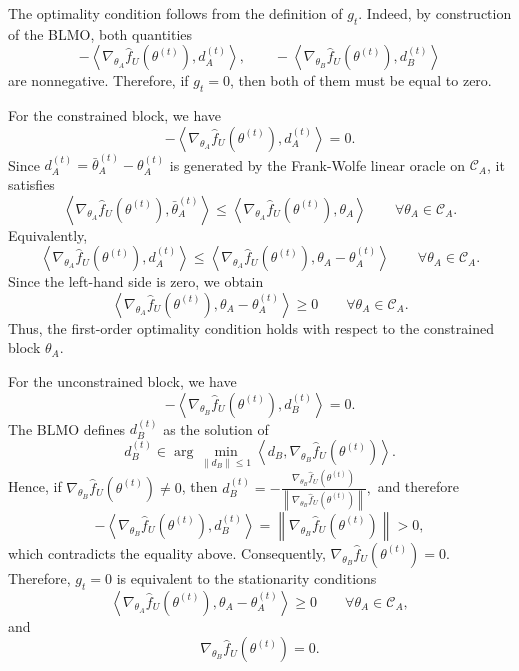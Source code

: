 \documentclass{article}
\begin{document}
The optimality condition follows from the definition of \(g_t\). Indeed, by construction of the
BLMO, both quantities
\[
    -
    \left\langle
        \nabla_{\theta_A}\widehat f_U(\theta^{(t)}),
        d_A^{(t)}
    \right\rangle,
    \qquad
    -
    \left\langle
        \nabla_{\theta_B}\widehat f_U(\theta^{(t)}),
        d_B^{(t)}
    \right\rangle
\]
are nonnegative. Therefore, if \(g_t=0\), then both of them must be equal to zero.

For the constrained block, we have
\[
    -
    \left\langle
        \nabla_{\theta_A}\widehat f_U(\theta^{(t)}),
        d_A^{(t)}
    \right\rangle
    =
    0.
\]
Since \(d_A^{(t)}=\bar\theta_A^{(t)}-\theta_A^{(t)}\) is generated by the Frank-Wolfe
linear oracle on \(\mathcal C_A\), it satisfies
\[
    \left\langle
        \nabla_{\theta_A}\widehat f_U(\theta^{(t)}),
        \bar\theta_A^{(t)}
    \right\rangle
    \le
    \left\langle
        \nabla_{\theta_A}\widehat f_U(\theta^{(t)}),
        \theta_A
    \right\rangle
    \qquad
    \forall \theta_A\in \mathcal C_A.
\]
Equivalently,
\[
    \left\langle
        \nabla_{\theta_A}\widehat f_U(\theta^{(t)}),
        d_A^{(t)}
    \right\rangle
    \le
    \left\langle
        \nabla_{\theta_A}\widehat f_U(\theta^{(t)}),
        \theta_A-\theta_A^{(t)}
    \right\rangle
    \qquad
    \forall \theta_A\in \mathcal C_A.
\]
Since the left-hand side is zero, we obtain
\[
    \left\langle
        \nabla_{\theta_A}\widehat f_U(\theta^{(t)}),
        \theta_A-\theta_A^{(t)}
    \right\rangle
    \ge 0
    \qquad
    \forall \theta_A\in \mathcal C_A.
\]
Thus, the first-order optimality condition holds with respect to the constrained block
\(\theta_A\).

For the unconstrained block, we have
\[
    -
    \left\langle
        \nabla_{\theta_B}\widehat f_U(\theta^{(t)}),
        d_B^{(t)}
    \right\rangle
    =
    0.
\]
The BLMO defines \(d_B^{(t)}\) as the solution of
\[
    d_B^{(t)}
    \in
    \arg\min_{\|d_B\|\le 1}
    \left\langle
        d_B,
        \nabla_{\theta_B}\widehat f_U(\theta^{(t)})
    \right\rangle .
\]
Hence, if \(\nabla_{\theta_B}\widehat f_U(\theta^{(t)})\neq 0\), then
$d_B^{(t)}
    =
    -
    \frac{
        \nabla_{\theta_B}\widehat f_U(\theta^{(t)})
    }{
        \left\|
            \nabla_{\theta_B}\widehat f_U(\theta^{(t)})
        \right\|
    },
$
and therefore
\[
    -
    \left\langle
        \nabla_{\theta_B}\widehat f_U(\theta^{(t)}),
        d_B^{(t)}
    \right\rangle
    =
    \left\|
        \nabla_{\theta_B}\widehat f_U(\theta^{(t)})
    \right\|
    >
    0,
\]
which contradicts the equality above. Consequently, $\nabla_{\theta_B}\widehat f_U(\theta^{(t)})=0.$
Therefore, \(g_t=0\) is equivalent to the stationarity conditions
\[
    \left\langle
        \nabla_{\theta_A}\widehat f_U(\theta^{(t)}),
        \theta_A-\theta_A^{(t)}
    \right\rangle
    \ge 0
    \qquad
    \forall \theta_A\in \mathcal C_A,
\]
and
\[
    \nabla_{\theta_B}\widehat f_U(\theta^{(t)})=0.
\]
\end{document}
